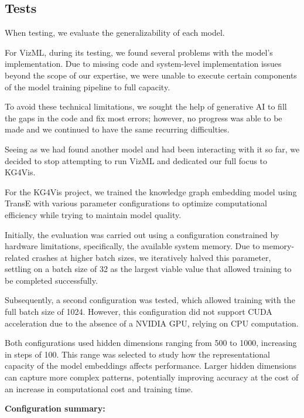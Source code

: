 \subsection{Tests}
When testing, we evaluate the generalizability of each model. \par
\vspace{10pt}
\noindent For VizML, during its testing, we found several problems with the model's implementation. Due to missing code and system-level implementation issues beyond the scope of our expertise, we were unable to execute certain components of the model training pipeline to full capacity. \par
To avoid these technical limitations, we sought the help of generative AI to fill the gaps in the code and fix most errors; however, no progress was able to be made and we continued to have the same recurring difficulties. \par
Seeing as we had found another model and had been interacting with it so far, we decided to stop attempting to run VizML and dedicated our full focus to KG4Vis. \par
\vspace{10pt}
\noindent For the KG4Vis project, we trained the knowledge graph embedding model using TransE with various parameter configurations to optimize computational efficiency while trying to maintain model quality. \par
Initially, the evaluation was carried out using a configuration constrained by hardware limitations, specifically, the available system memory. Due to memory-related crashes at higher batch sizes, we iteratively halved this parameter, settling on a batch size of 32 as the largest viable value that allowed training to be completed successfully.\par
Subsequently, a second configuration was tested, which allowed training with the full batch size of 1024. However, this configuration did not support CUDA acceleration due to the absence of a NVIDIA GPU, relying on CPU computation. \par
Both configurations used hidden dimensions ranging from 500 to 1000, increasing in steps of 100. This range was selected to study how the representational capacity of the model embeddings affects performance. Larger hidden dimensions can capture more complex patterns, potentially improving accuracy at the cost of an increase in computational cost and training time. \par
\vspace{0.3cm}
\noindent\textbf{Configuration summary:}
